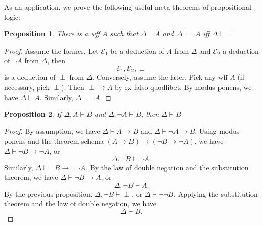 \documentclass[12pt]{article}
\newtheorem{prop}{Proposition}
\begin{document}
As an application, we prove the following useful meta-theorems of propositional logic:
\begin{prop} There is a wff $A$ such that $\Delta \vdash A$ and $\Delta \vdash \neg A$ iff $\Delta \vdash \perp$ \end{prop}
\begin{proof}  Assume the former.  Let $\mathcal{E}_1$ be a deduction of $A$ from $\Delta$ and $\mathcal{E}_2$ a deduction of $\neg A$ from $\Delta$, then $$\mathcal{E}_1, \mathcal{E}_2, \perp$$ is a deduction of $\perp$ from $\Delta$.  Conversely, assume the later.  Pick any wff $A$ (if necessary, pick $\perp$).  Then $\perp \to A$ by ex falso quodlibet.  By modus ponens, we have $\Delta \vdash A$.  Similarly, $\Delta \vdash \neg A$.
\end{proof}

\begin{prop} If $\Delta, A \vdash B$ and $\Delta, \neg A \vdash B$, then $\Delta \vdash B$ \end{prop}
\begin{proof}  By assumption, we have $\Delta \vdash A\to B$ and $\Delta \vdash \neg A \to B$.  Using modus ponens and the theorem schema $(A\to B)\to (\neg B\to \neg A)$, we have $\Delta \vdash \neg B \to \neg A$, or $$\Delta, \neg B \vdash \neg A.$$  
Similarly, $\Delta \vdash \neg B \to \neg \neg A$.  By the law of double negation and the substitution theorem, we have $\Delta \vdash \neg B \to A$, or $$\Delta, \neg B \vdash A.$$  
By the previous proposition, $\Delta, \neg B \vdash \perp$, or $\Delta \vdash \neg \neg B$.  Applying the substitution theorem and the law of double negation, we have $$\Delta \vdash B.$$
\end{proof}

\end{document}
